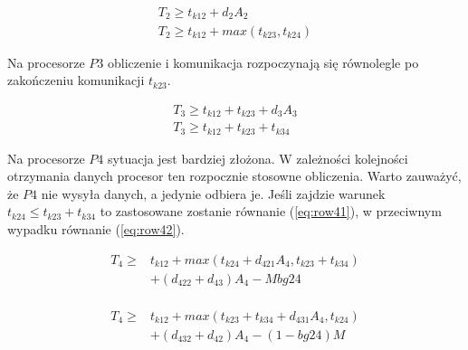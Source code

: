 \begin{equation}
\begin{array}{l}
T_{2} \geq t_{k12} + d_{2}A_{2} \\
T_{2} \geq t_{k12} + max(t_{k23}, t_{k24})
\end{array}
\end{equation}

Na procesorze $P3$ obliczenie i komunikacja rozpoczynają się równolegle po zakończeniu komunikacji $t_{k23}$.

\begin{equation}
\begin{array}{l}
T_{3} \geq t_{k12} + t_{k23} + d_{3}A_{3} \\
T_{3} \geq t_{k12} + t_{k23} + t_{k34}
\end{array}
\end{equation}

Na procesorze $P4$ sytuacja jest bardziej złożona. W zależności kolejności otrzymania danych procesor ten rozpocznie stosowne obliczenia.
Warto zauważyć, że $P4$ nie wysyła danych, a jedynie odbiera je.
Jeśli zajdzie warunek $t_{k24} \leq t_{k23} + t_{k34}$ to zastosowane zostanie równanie (\ref{eq:row41}), w przeciwnym wypadku równanie (\ref{eq:row42}).

\begin{equation} \label{eq:row41}
\begin{array}{rl}
T_{4} \geq &t_{k12} + max(t_{k24} + d_{421}A_{4}, t_{k23} + t_{k34}) \\
&+ (d_{422} + d_{43})A_{4} - Mbg24 \\
\end{array}
\end{equation}

\begin{equation} \label{eq:row42}
\begin{array}{rl}
T_{4} \geq &t_{k12} + max(t_{k23} + t_{k34} + d_{431}A_{4}, t_{k24}) \\
&+ (d_{432} + d_{42})A_{4} - (1-bg24)M
\end{array}
\end{equation}
